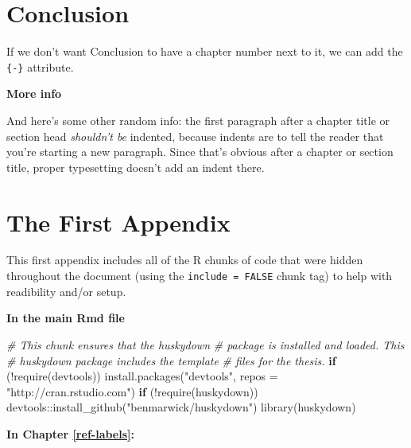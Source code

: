 \documentclass[print]{nuthesis}
\newenvironment{Shaded}{\begin{snugshade}}{\end{snugshade}}
\newcommand{\AttributeTok}[1]{\textcolor[rgb]{0.77,0.63,0.00}{#1}}
\newcommand{\CommentTok}[1]{\textcolor[rgb]{0.56,0.35,0.01}{\textit{#1}}}
\newcommand{\ControlFlowTok}[1]{\textcolor[rgb]{0.13,0.29,0.53}{\textbf{#1}}}
\newcommand{\FunctionTok}[1]{\textcolor[rgb]{0.00,0.00,0.00}{#1}}
\newcommand{\NormalTok}[1]{#1}
\newcommand{\SpecialCharTok}[1]{\textcolor[rgb]{0.00,0.00,0.00}{#1}}
\newcommand{\StringTok}[1]{\textcolor[rgb]{0.31,0.60,0.02}{#1}}
\begin{document}
\hypertarget{conclusion}{%
\chapter*{Conclusion}\label{conclusion}}

If we don't want Conclusion to have a chapter number next to it, we can add the \texttt{\{-\}} attribute.

\textbf{More info}

And here's some other random info: the first paragraph after a chapter title or section head \emph{shouldn't be} indented, because indents are to tell the reader that you're starting a new paragraph. Since that's obvious after a chapter or section title, proper typesetting doesn't add an indent there.

\appendix

\hypertarget{the-first-appendix}{%
\chapter{The First Appendix}\label{the-first-appendix}}

This first appendix includes all of the R chunks of code that were hidden throughout the document (using the \texttt{include\ =\ FALSE} chunk tag) to help with readibility and/or setup.

\textbf{In the main Rmd file}

\begin{Shaded}
\begin{Highlighting}[]
\CommentTok{\# This chunk ensures that the huskydown}
\CommentTok{\# package is installed and loaded. This}
\CommentTok{\# huskydown package includes the template}
\CommentTok{\# files for the thesis.}
\ControlFlowTok{if}\NormalTok{ (}\SpecialCharTok{!}\FunctionTok{require}\NormalTok{(devtools)) }\FunctionTok{install.packages}\NormalTok{(}\StringTok{"devtools"}\NormalTok{, }
    \AttributeTok{repos =} \StringTok{"http://cran.rstudio.com"}\NormalTok{)}
\ControlFlowTok{if}\NormalTok{ (}\SpecialCharTok{!}\FunctionTok{require}\NormalTok{(huskydown)) devtools}\SpecialCharTok{::}\FunctionTok{install\_github}\NormalTok{(}\StringTok{"benmarwick/huskydown"}\NormalTok{)}
\FunctionTok{library}\NormalTok{(huskydown)}
\end{Highlighting}
\end{Shaded}

\textbf{In Chapter \ref{ref-labels}:}
\end{document}
